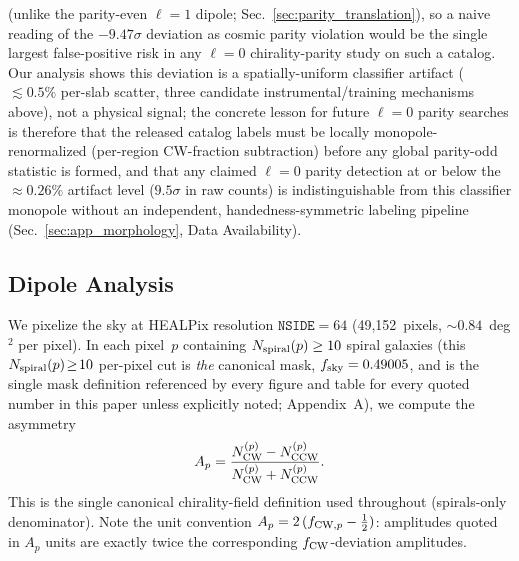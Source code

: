 \documentclass[aps,prd,twocolumn,superscriptaddress,preprintnumbers,nofootinbib,longbibliography,floatfix]{revtex4-2}
\newcommand{\nside}{\texttt{NSIDE}}
\newcommand{\sigmaunit}{\sigma}
\begin{document}
(unlike the parity-even $\ell\!=\!1$ dipole; Sec.~\ref{sec:parity_translation}), so a naive reading of the $-9.47\sigmaunit$ deviation as cosmic parity violation would be the single largest false-positive risk in any $\ell\!=\!0$ chirality-parity study on such a catalog. Our analysis shows this deviation is a spatially-uniform classifier artifact ($\lesssim\!0.5\%$ per-slab scatter, three candidate instrumental/training mechanisms above), not a physical signal; the concrete lesson for future $\ell\!=\!0$ parity searches is therefore that the released catalog labels must be locally monopole-renormalized (per-region CW-fraction subtraction) before any global parity-odd statistic is formed, and that any claimed $\ell\!=\!0$ parity detection at or below the $\approx\!0.26\%$ artifact level ($9.5\sigmaunit$ in raw counts) is indistinguishable from this classifier monopole without an independent, handedness-symmetric labeling pipeline (Sec.~\ref{sec:app_morphology}, Data Availability).

\subsection{Dipole Analysis}
\label{sec:dipole}

We pixelize the sky at HEALPix resolution $\nside = 64$ (49,152~pixels, $\sim\!0.84$~deg$^2$ per pixel). In each pixel~$p$ containing $N_{\rm spiral}(p) \geq 10$ spiral galaxies (this $N_{\rm spiral}(p)\!\ge\!10$ per-pixel cut is \emph{the} canonical mask, $f_{\rm sky}=0.49005$, and is the single mask definition referenced by every figure and table for every quoted number in this paper unless explicitly noted; Appendix~A), we compute the asymmetry
\begin{equation}
A_p = \frac{N_{\rm CW}^{(p)} - N_{\rm CCW}^{(p)}}{N_{\rm CW}^{(p)} + N_{\rm CCW}^{(p)}}.
\label{eq:ap_def}
\end{equation}
This is the single canonical chirality-field definition used throughout (spirals-only denominator). Note the unit convention $A_p = 2\,(f_{{\rm CW},p}-\tfrac12)$: amplitudes quoted in $A_p$ units are exactly twice the corresponding $f_{\rm CW}$-deviation amplitudes.
\end{document}

